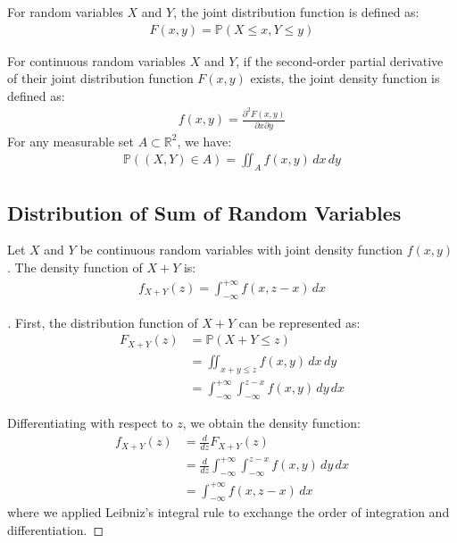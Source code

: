 \begin{definition}{}
For random variables $X$ and $Y$, the joint distribution function is defined as:
\begin{align*}
F(x,y) = \mathbb{P}(X \leq x, Y \leq y)
\end{align*}
\end{definition}

\begin{definition}{}
For continuous random variables $X$ and $Y$, if the second-order partial derivative of their joint distribution function $F(x,y)$ exists, the joint density function is defined as:
\begin{align*}
f(x,y) = \frac{\partial^2 F(x,y)}{\partial x \partial y}
\end{align*}
For any measurable set $A \subset \mathbb{R}^2$, we have:
\begin{align*}
\mathbb{P}((X,Y) \in A) = \iint_A f(x,y) \,dx\,dy
\end{align*}
\end{definition}

\subsection{Distribution of Sum of Random Variables}

\begin{proposition}{}
Let $X$ and $Y$ be continuous random variables with joint density function $f(x,y)$. The density function of $X+Y$ is:
\begin{align*}
f_{X+Y}(z) = \int_{-\infty}^{+\infty} f(x, z-x) \,dx
\end{align*}
\end{proposition}

\begin{proof}[]{}
First, the distribution function of $X+Y$ can be represented as:
\begin{align*}
F_{X+Y}(z) &= \mathbb{P}(X+Y \leq z)\\
&= \iint_{x+y \leq z} f(x,y) \,dx\,dy\\
&= \int_{-\infty}^{+\infty}\int_{-\infty}^{z-x} f(x,y) \,dy \,dx
\end{align*}

Differentiating with respect to $z$, we obtain the density function:
\begin{align*}
f_{X+Y}(z) &= \frac{d}{dz}F_{X+Y}(z)\\
&= \frac{d}{dz}\int_{-\infty}^{+\infty}\int_{-\infty}^{z-x} f(x,y) \,dy \,dx\\
&= \int_{-\infty}^{+\infty} f(x, z-x) \,dx
\end{align*}
where we applied Leibniz's integral rule to exchange the order of integration and differentiation.
\end{proof}

